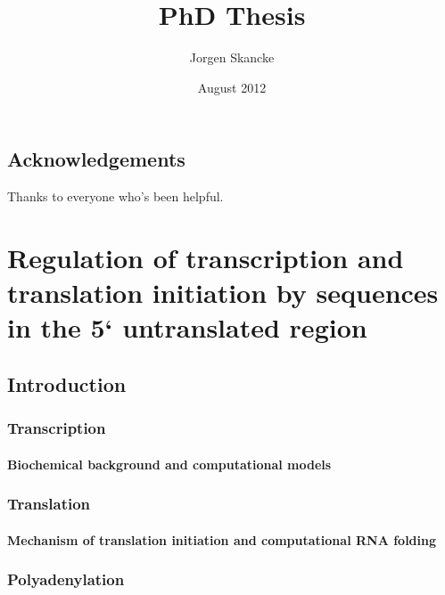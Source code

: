 \documentclass[b5paper]{report}
\title{PhD Thesis}
\author{Jorgen Skancke}
\date{August 2012}
\begin{document}
 

\chapter*{Acknowledgements}
Thanks to everyone who's been helpful.

\maketitle

\part{Regulation of transcription and translation initiation by sequences in
the 5` untranslated region}

\chapter{Introduction}

%

\section{Transcription}

\subsection{Biochemical background and computational models}



\section{Translation}

\subsection{Mechanism of translation initiation and computational RNA folding}

\section{Polyadenylation}
%
\end{document}
